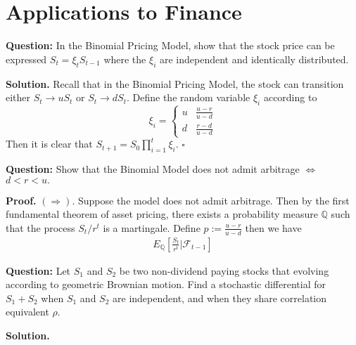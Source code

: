 \documentclass{article}
\begin{document}
\newpage
\section{Applications to Finance}

\begin{tcolorbox}[colframe=black,colback=gray!5,boxrule=0.5pt]
\textbf{Question:} In the Binomial Pricing Model, show that the stock price can be expressed $S_t = \xi_tS_{t-1}$ where the $\xi_i$ are independent and identically distributed.   \cite{Fima}
\end{tcolorbox}
\textbf{Solution.}
Recall that in the Binomial Pricing Model, the stock can transition either $S_{t} \to uS_t$ or $S_t \to dS_t$. Define the random variable $\xi_i$ according to 
\[ \xi_i = \begin{cases} 
      u & \frac{u-r}{u-d} \\
      d & \frac{r-d}{u-d}
   \end{cases}
\]
Then it is clear that $S_{t+1} = S_0\prod_{i=1}^{t}\xi_i$. $\square$

\begin{tcolorbox}[colframe=black,colback=gray!5,boxrule=0.5pt]
\textbf{Question:} Show that the Binomial Model does not admit arbitrage $\iff$ $d<r<u.$
\end{tcolorbox}
\textbf{Proof.}
$(\Rightarrow)$. Suppose the model does not admit arbitrage. Then by the first fundamental theorem of asset pricing, there exists a probability measure $\mathbb{Q}$ such that the process $S_t / r^t$ is a martingale. Define $p:= \frac{u-r}{u-d}$ then we have 
\begin{align*}
    E_\mathbb{Q}\left[\frac{S_t}{r^t} | \mathcal{F}_{t-1}\right]
\end{align*}
 
\begin{tcolorbox}[colframe=black,colback=gray!5,boxrule=0.5pt]
\textbf{Question:} Let $S_1$ and $S_2$ be two non-dividend paying stocks that evolving according to geometric Brownian motion. Find a stochastic differential for $S_1 + S_2$ when $S_1$ and $S_2$ are independent, and when they share correlation equivalent $\rho$.  \cite{Hull}
\end{tcolorbox}
\textbf{Solution.}
\end{document}
